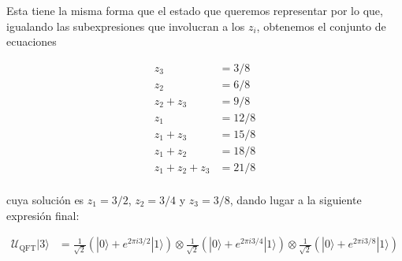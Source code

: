 \documentclass{article}
\begin{document}
Esta tiene la misma forma que el estado que queremos representar por
lo que, igualando las subexpresiones que involucran a los $z_i$,
obtenemos el conjunto de ecuaciones

\begin{align*}
  z_3 &= 3/8 \\
  z_2 &= 6/8 \\
  z_2 + z_3 &= 9/8 \\
  z_1 &= 12/8 \\
  z_1 + z_3 &= 15/8 \\
  z_1 + z_2 &= 18/8 \\
  z_1 + z_2 + z_3 &= 21/8 \\
\end{align*}

cuya solución es $z_1 = 3/2$, $z_2 = 3/4$ y $z_3 = 3/8$, dando lugar
a la siguiente expresión final:

\begin{align*}
  \mathcal{U}_\text{QFT}|3\rangle 
  &= \frac{1}{\sqrt{2}}(|0\rangle + e^{2\pi i 3/2}|1\rangle)
    \otimes \frac{1}{\sqrt{2}}(|0\rangle + e^{2\pi i 3/4}|1\rangle)
    \otimes \frac{1}{\sqrt{2}}(|0\rangle + e^{2\pi i 3/8}|1\rangle)
\end{align*}
\end{document}
